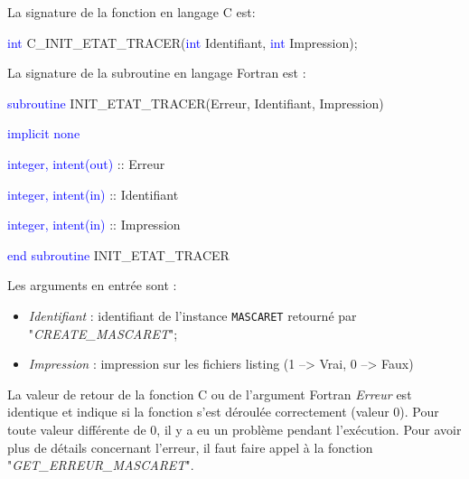 \documentclass[a4paper,11pt]{article}
\begin{document}
 \vspace{0.5cm}
 
 La signature de la fonction en langage C est:
 
 \vspace{0.5cm}
 
 \textcolor{blue}{int} C\_INIT\_ETAT\_TRACER(\textcolor{blue}{int} Identifiant, \textcolor{blue}{int} Impression);
 
 \vspace{0.5cm} 
 
 La signature de la subroutine en langage Fortran est :
 
 \vspace{0.5cm}
 
    \textcolor{blue}{subroutine} INIT\_ETAT\_TRACER(Erreur, Identifiant, Impression)
    
        \hspace{1cm}\textcolor{blue}{implicit none}                 
        
        \hspace{1cm} \textcolor{blue}{integer, intent(out)} :: Erreur
        
        \hspace{1cm} \textcolor{blue}{integer, intent(in)}  :: Identifiant
        
        \hspace{1cm} \textcolor{blue}{integer, intent(in)}  :: Impression
        
    \textcolor{blue}{end subroutine} INIT\_ETAT\_TRACER

 \vspace{0.5cm}

 Les arguments en entr\'ee sont :
 
 \vspace{0.5cm}
 
 \begin{itemize}
   \item \textit{Identifiant} : identifiant de l'instance \texttt{MASCARET} retourn\'e par "\textit{CREATE\_MASCARET}";
    \vspace{0.5cm}
   \item  \textit{Impression} : impression sur les fichiers listing (1 --> Vrai, 0 --> Faux)
 \end{itemize}

 \vspace{0.5cm}
 
  La valeur de retour de la fonction C ou de l'argument Fortran \textit{Erreur} est identique et indique si la fonction s'est d\'eroul\'ee correctement (valeur 0). Pour toute valeur diff\'erente de 0, il y a eu un probl\`eme pendant l'ex\'ecution. Pour avoir plus de d\'etails concernant l'erreur, il faut faire appel \`a la fonction "\textit{GET\_ERREUR\_MASCARET}".
  
\end{document}
